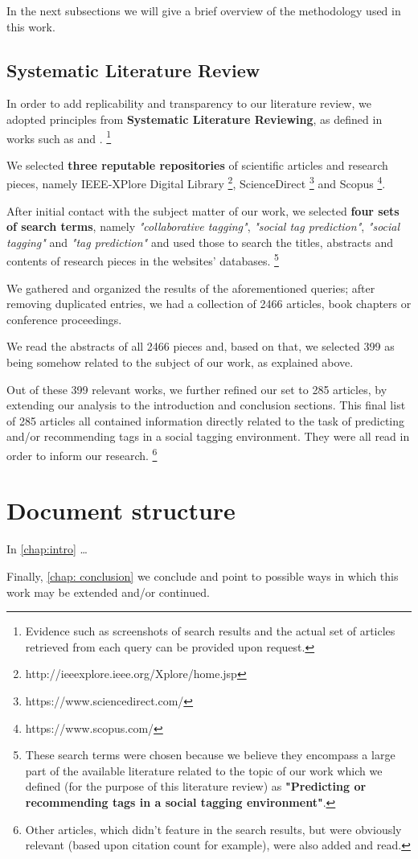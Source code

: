 In the next subsections we will give a brief overview of the methodology used in this work.

\subsection{Systematic Literature Review}\label{section:literature_review}

In order to add replicability and transparency to our literature review, we adopted principles from \textbf{Systematic Literature Reviewing}, as defined in works such as \cite{baumeister_leary_1997} and \cite{bem_1995}. \footnote{Evidence such as screenshots of search results and the actual set of articles retrieved from each query can be provided upon request.}

We selected \textbf{three reputable repositories} of scientific articles and research pieces, namely IEEE-XPlore Digital Library \footnote{http://ieeexplore.ieee.org/Xplore/home.jsp}, ScienceDirect \footnote{https://www.sciencedirect.com/} and Scopus \footnote{https://www.scopus.com/}.

After initial contact with the subject matter of our work, we selected \textbf{four sets of search terms}, namely \textit{"collaborative tagging"}, \textit{"social tag prediction"}, \textit{"social tagging"} and \textit{"tag prediction"} and used those to search the titles, abstracts and contents of research pieces in the websites' databases. \footnote{These search terms were chosen because we believe they encompass a large part  of the available literature related to the topic of our work which we defined (for the purpose of this literature review) as \textbf{"Predicting or recommending tags in a social tagging environment"}.} 

We gathered and organized the results of the aforementioned queries; after removing duplicated entries, we had a collection of 2466 articles, book chapters or conference proceedings.

We read the abstracts of all 2466 pieces and, based on that, we selected 399 as being somehow related to the subject of our work, as explained above.

Out of these 399 relevant works, we further refined our set to 285 articles, by extending our analysis to the introduction and conclusion sections. This final list of 285 articles all contained information directly related to the task of predicting and/or recommending tags in a social tagging environment. They were all read in order to inform our research. \footnote{Other articles, which didn't feature in the search results, but were obviously relevant (based upon citation count for example), were also added and read.}


\section{Document structure}\label{section:intro_structure}

In \autoref{chap:intro} \ldots

Finally, \autoref{chap: conclusion} we conclude and point to possible ways in which this work may be extended and/or continued.